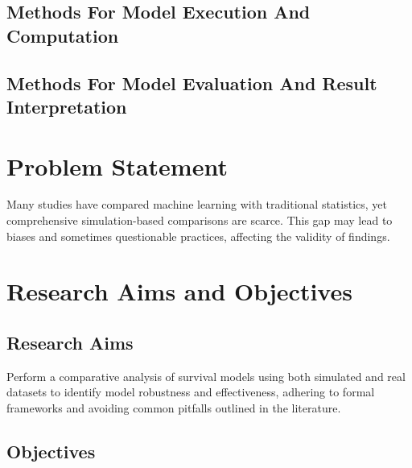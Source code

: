 \subsection{Methods For Model Execution And Computation}

\subsection{Methods For Model Evaluation And Result Interpretation}



\section{Problem Statement}

\noindent 
Many studies have compared machine learning with traditional statistics, yet comprehensive simulation-based comparisons are scarce. This gap may lead to biases and sometimes questionable practices, affecting the validity of findings.

\section{Research Aims and Objectives}

\subsection{Research Aims}

\noindent 
Perform a comparative analysis of survival models using both simulated and real datasets to identify model robustness and effectiveness, adhering to formal frameworks and avoiding common pitfalls outlined in the literature.

\subsection{Objectives}

